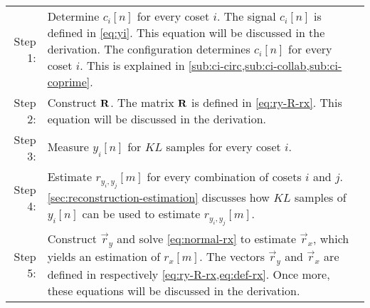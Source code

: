 \documentclass[a4paper, openany, oneside]{memoir}
\begin{document}
\begin{tabularx}{\textwidth}{rY}
    Step 1: & Determine $c_i[n]$ for every coset $i$.
    \newline \newline
    The signal $c_i[n]$ is defined in \cref{eq:yi}. This equation will be discussed in the derivation. The configuration determines $c_i[n]$ for every coset $i$. This is explained in \cref{sub:ci-circ,sub:ci-collab,sub:ci-coprime}.
    \newline \\
    Step 2: & Construct $\boldsymbol{\mathbf{R}}$.
    \newline \newline
    The matrix $\boldsymbol{\mathbf{R}}$ is defined in \cref{eq:ry-R-rx}. This equation will be discussed in the derivation.
    \newline \\
    Step 3: & Measure $y_i[n]$ for $KL$ samples for every coset $i$. \newline \\
    Step 4: & Estimate $r_{y_i,y_j}[m]$ for every combination of cosets $i$ and $j$.
    \newline \newline
    \cref{sec:reconstruction-estimation} discusses how $KL$ samples of $y_i[n]$ can be used to estimate $r_{y_i,y_j}[m]$.
    \newline \\
    Step 5: & Construct $\vec{r}_y$ and solve \cref{eq:normal-rx} to estimate $\vec{r}_x$, which yields an estimation of $r_x[m]$.
    \newline \newline
    The vectors $\vec{r}_y$ and $\vec{r}_x$ are defined in respectively \cref{eq:ry-R-rx,eq:def-rx}. Once more, these equations will be discussed in the derivation.  \\
\end{tabularx}
\end{document}
